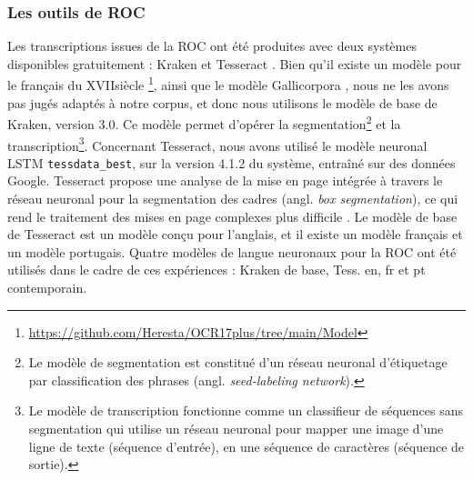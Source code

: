 \subsubsection{Les outils de ROC}
Les transcriptions issues de la ROC ont été produites avec deux systèmes disponibles gratuitement : Kraken \cite{kiessling2019kraken} et Tesseract \cite{smith2007overview}. Bien qu'il existe un modèle pour le français du XVII\ieme{}siècle \cite{gabay:hal-02577236}\footnote{\url{https://github.com/Heresta/OCR17plus/tree/main/Model}}, ainsi que le modèle Gallicorpora \cite{pinche_2022_7410529}, nous ne les avons pas jugés adaptés à notre corpus, et donc nous utilisons le modèle de base de Kraken, version 3.0. Ce modèle permet d'opérer la segmentation\footnote{Le modèle de segmentation est constitué d'un réseau neuronal d'étiquetage par classification des phrases (angl. \textit{seed-labeling network}).
} et la transcription\footnote{Le modèle de transcription fonctionne comme un classifieur de séquences sans segmentation qui utilise un réseau neuronal pour mapper une image d'une ligne de texte (séquence d'entrée), en une séquence de caractères (séquence de sortie). 
}.
Concernant Tesseract, nous avons utilisé le modèle neuronal LSTM \texttt{tessdata\_best}, sur la version 4.1.2 du système, entraîné sur des données Google. Tesseract propose une analyse de la mise en page intégrée à travers le réseau neuronal pour la segmentation des cadres (angl. \textit{box segmentation}), ce qui rend le traitement des mises en page complexes plus difficile \cite{reul2017case}. Le modèle de base de Tesseract est un modèle conçu pour l'anglais, et il existe un modèle français et un modèle portugais. Quatre modèles de langue neuronaux pour la ROC ont été utilisés dans le cadre de ces expériences : Kraken de base, Tess. en, fr et pt contemporain.

